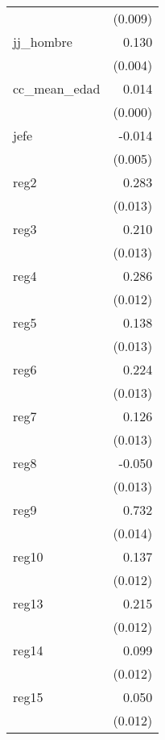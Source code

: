 {\begin{longtable}{l*{1}{D{.}{.}{-1}}}
            &     (0.009)         \\
\addlinespace
jj\_hombre   &       0.130\sym{***}\\
            &     (0.004)         \\
\addlinespace
cc\_mean\_edad&       0.014\sym{***}\\
            &     (0.000)         \\
\addlinespace
jefe        &      -0.014\sym{**} \\
            &     (0.005)         \\
\addlinespace
reg2        &       0.283\sym{***}\\
            &     (0.013)         \\
\addlinespace
reg3        &       0.210\sym{***}\\
            &     (0.013)         \\
\addlinespace
reg4        &       0.286\sym{***}\\
            &     (0.012)         \\
\addlinespace
reg5        &       0.138\sym{***}\\
            &     (0.013)         \\
\addlinespace
reg6        &       0.224\sym{***}\\
            &     (0.013)         \\
\addlinespace
reg7        &       0.126\sym{***}\\
            &     (0.013)         \\
\addlinespace
reg8        &      -0.050\sym{***}\\
            &     (0.013)         \\
\addlinespace
reg9        &       0.732\sym{***}\\
            &     (0.014)         \\
\addlinespace
reg10       &       0.137\sym{***}\\
            &     (0.012)         \\
\addlinespace
reg13       &       0.215\sym{***}\\
            &     (0.012)         \\
\addlinespace
reg14       &       0.099\sym{***}\\
            &     (0.012)         \\
\addlinespace
reg15       &       0.050\sym{***}\\
            &     (0.012)         \\

\end{longtable}}

